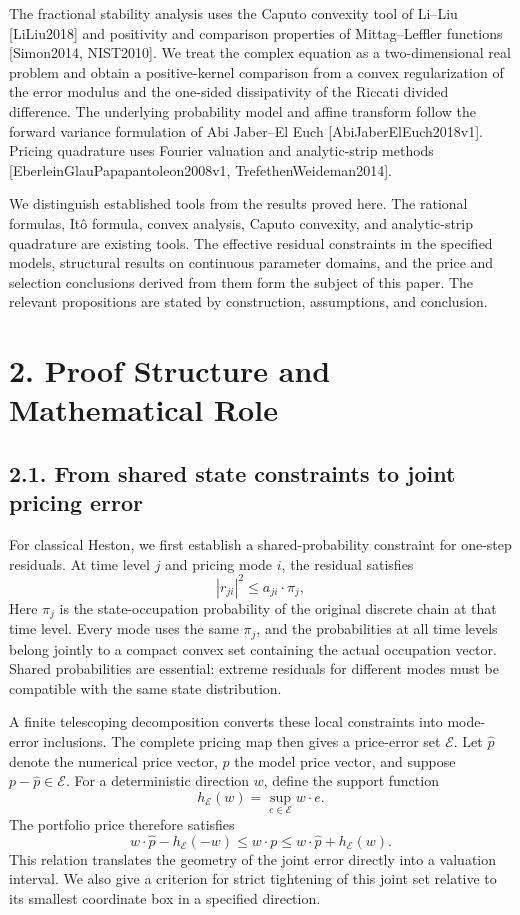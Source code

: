 \documentclass[a4paper,11pt]{article}
\begin{document}
The fractional stability analysis uses the Caputo convexity tool of Li–Liu [LiLiu2018] and positivity and comparison properties of Mittag–Leffler functions [Simon2014, NIST2010]. We treat the complex equation as a two-dimensional real problem and obtain a positive-kernel comparison from a convex regularization of the error modulus and the one-sided dissipativity of the Riccati divided difference. The underlying probability model and affine transform follow the forward variance formulation of Abi Jaber–El Euch [AbiJaberElEuch2018v1]. Pricing quadrature uses Fourier valuation and analytic-strip methods [EberleinGlauPapapantoleon2008v1, TrefethenWeideman2014].

We distinguish established tools from the results proved here. The rational formulas, Itô formula, convex analysis, Caputo convexity, and analytic-strip quadrature are existing tools. The effective residual constraints in the specified models, structural results on continuous parameter domains, and the price and selection conclusions derived from them form the subject of this paper. The relevant propositions are stated by construction, assumptions, and conclusion.

\section*{2. Proof Structure and Mathematical Role}

\subsection*{2.1. From shared state constraints to joint pricing error}

For classical Heston, we first establish a shared-probability constraint for one-step residuals. At time level \(j\) and pricing mode \(i\), the residual satisfies
\[
|r_{ji}|^2\le a_{ji}\cdot\pi_j,
\]
Here \(\pi_j\) is the state-occupation probability of the original discrete chain at that time level. Every mode uses the same \(\pi_j\), and the probabilities at all time levels belong jointly to a compact convex set containing the actual occupation vector. Shared probabilities are essential: extreme residuals for different modes must be compatible with the same state distribution.

A finite telescoping decomposition converts these local constraints into mode-error inclusions. The complete pricing map then gives a price-error set \(\mathcal E\). Let \(\widehat p\) denote the numerical price vector, \(p\) the model price vector, and suppose \(p-\widehat p\in\mathcal E\). For a deterministic direction \(w\), define the support function
\[
h_{\mathcal E}(w)=\sup_{e\in\mathcal E}w\cdot e.
\]
The portfolio price therefore satisfies
\[
w\cdot\widehat p-h_{\mathcal E}(-w)
\le w\cdot p
\le w\cdot\widehat p+h_{\mathcal E}(w).
\]
This relation translates the geometry of the joint error directly into a valuation interval. We also give a criterion for strict tightening of this joint set relative to its smallest coordinate box in a specified direction.
\end{document}
